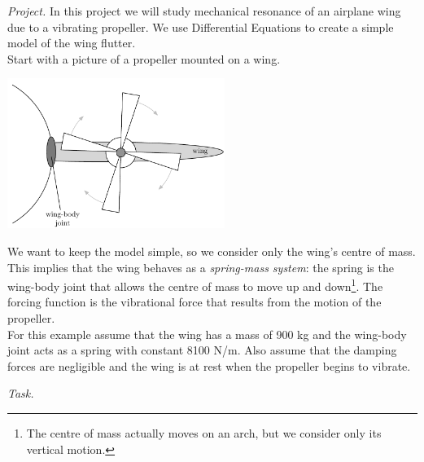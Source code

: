 \emph{Project. } In this project we will study mechanical resonance of an airplane wing due to a vibrating propeller.
We use Differential Equations to create a simple model of the wing flutter. \\

Start with a picture of a propeller mounted on a wing.

\begin{center}
\includegraphics*[width=200pt]{images/project-wing-wing.pdf}
\end{center}

We want to keep the model simple, so we consider only the wing's centre of mass. This implies that the wing behaves as a \emph{spring-mass system}: the spring is the wing-body joint that allows the centre of mass to move up and down\footnote{The centre of mass actually moves on an arch, but we consider only its vertical motion.}. The forcing function is the vibrational force that results from the motion of the propeller. \\

For this example assume that the wing has a mass of 900 kg and the wing-body joint acts as a spring with constant 8100 N/m. Also assume that the damping forces are negligible and the wing is at rest when the propeller begins to vibrate.

\emph{Task. } 

